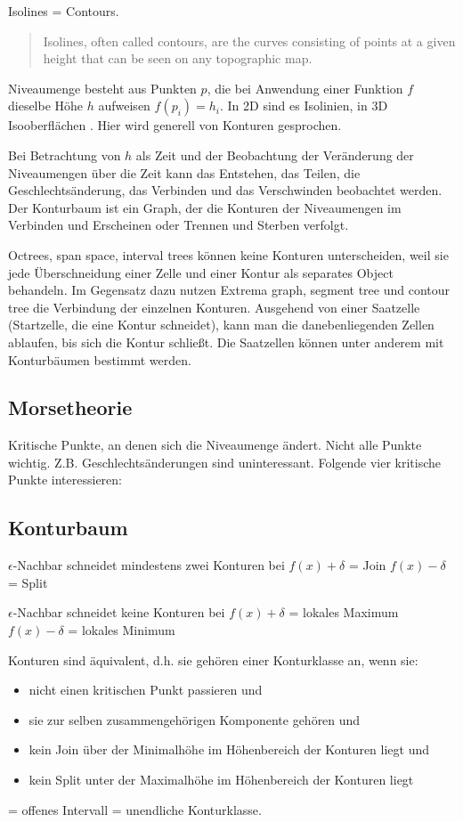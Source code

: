 Isolines = Contours.
\blockcquote[1]{carr2001computingCountourTrees}{Isolines, often called contours, are the curves consisting of points at a given height that can be seen on any topographic map.}

Niveaumenge besteht aus Punkten $p$, die bei Anwendung einer Funktion $f$ dieselbe Höhe $h$ aufweisen $f(p_i) = h_i$. In 2D sind es Isolinien, in 3D Isooberflächen \cite[S.~2]{carr2001computingCountourTrees}. Hier wird generell von Konturen gesprochen.

Bei Betrachtung von $h$ als Zeit und der Beobachtung der Veränderung der Niveaumengen über die Zeit kann das Entstehen, das Teilen, die Geschlechtsänderung, das Verbinden und das Verschwinden beobachtet werden. Der Konturbaum ist ein Graph, der die Konturen der Niveaumengen im Verbinden und Erscheinen oder Trennen und Sterben verfolgt.

\cite[S.~3]{carr2001computingCountourTrees}
Octrees, span space, interval trees können keine Konturen unterscheiden, weil sie jede Überschneidung einer Zelle und einer Kontur als separates Object behandeln. Im Gegensatz dazu nutzen Extrema graph, segment tree und contour tree die Verbindung der einzelnen Konturen. Ausgehend von einer Saatzelle (Startzelle, die eine Kontur schneidet), kann man die danebenliegenden Zellen ablaufen, bis sich die Kontur schließt. Die Saatzellen können unter anderem mit Konturbäumen bestimmt werden.

\subsection{Morsetheorie}
Kritische Punkte, an denen sich die Niveaumenge ändert. Nicht alle Punkte wichtig. Z.B. Geschlechtsänderungen sind uninteressant. Folgende vier kritische Punkte interessieren:

\subsection{Konturbaum}
$\epsilon$-Nachbar schneidet mindestens zwei Konturen bei
$f(x)+\delta$ = Join
$f(x)-\delta$ = Split

$\epsilon$-Nachbar schneidet keine Konturen bei
$f(x)+\delta$ = lokales Maximum
$f(x)-\delta$ = lokales Minimum

Konturen sind äquivalent, d.h. sie gehören einer Konturklasse an, wenn sie:
\begin{itemize}
	\item nicht einen kritischen Punkt passieren und
	\item sie zur selben zusammengehörigen Komponente gehören und
	\item kein Join über der Minimalhöhe im Höhenbereich der Konturen liegt und
	\item kein Split unter der Maximalhöhe im Höhenbereich der Konturen liegt
\end{itemize} = offenes Intervall = unendliche Konturklasse.

